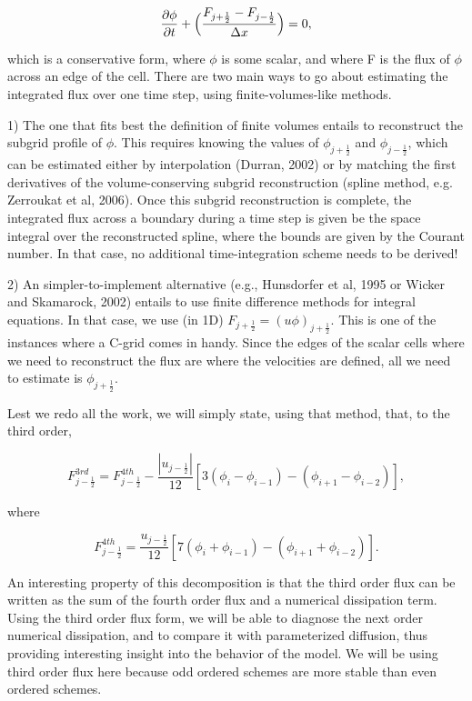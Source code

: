 \documentclass[11pt]{article}
\begin{document}
\begin{equation}
\pdv{\phi}{t} + \Big(\frac{F_{j+\frac{1}{2}}-F_{j-\frac{1}{2}}}{\Delta x}\Big) = 0,
\end{equation}

which is a conservative form, where $\phi$ is some scalar, and where F is the flux of $\phi$ across an edge of the cell. There are two main ways to go about estimating the integrated flux over one time step, using finite-volumes-like methods.

1) The one that fits best the definition of finite volumes entails to reconstruct the subgrid profile of $\phi$. This requires knowing the values of $\phi_{j+\frac{1}{2}}$ and $\phi_{j-\frac{1}{2}}$, which can be estimated either by interpolation (Durran, 2002) or by matching the first derivatives of the volume-conserving subgrid reconstruction (spline method, e.g. Zerroukat et al, 2006). Once this subgrid reconstruction is complete, the integrated flux across a boundary during a time step is given be the space integral over the reconstructed spline, where the bounds are given by the Courant number. In that case, no additional time-integration scheme needs to be derived!

2) An simpler-to-implement alternative (e.g., Hunsdorfer et al, 1995 or Wicker and Skamarock, 2002) entails to use finite difference methods for integral equations. In that case, we use (in 1D) $F_{j+\frac{1}{2}} = (u\phi)_{j+\frac{1}{2}}$. This is one of the instances where a C-grid comes in handy. Since the edges of the scalar cells where we need to reconstruct the flux are where the velocities are defined, all we need to estimate is $\phi_{j+\frac{1}{2}}$.

Lest we redo all the work, we will simply state, using that method, that, to the third order,

\begin{equation}
F_{j-\frac{1}{2}}^{3rd} = F_{j-\frac{1}{2}}^{4th} - \frac{|u_{j-\frac{1}{2}}|}{12}[3(\phi_i - \phi_{i-1}) - (\phi_{i+1}- \phi_{i-2})],
\end{equation}

where

\begin{equation}
F_{j-\frac{1}{2}}^{4th} = \frac{u_{j-\frac{1}{2}}}{12}[7(\phi_i + \phi_{i-1}) - (\phi_{i+1} + \phi_{i-2})].
\end{equation}

An interesting property of this decomposition is that the third order flux can be written as the sum of the fourth order flux and a numerical dissipation term. Using the third order flux form, we will be able to diagnose the next order numerical dissipation, and to compare it with parameterized diffusion, thus providing interesting insight into the behavior of the model. We will be using third order flux here because odd ordered schemes are more stable than even ordered schemes. 
\end{document}
